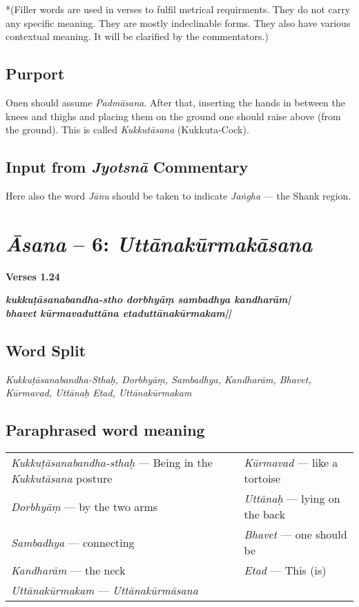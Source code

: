 *(Filler words are used in verses to fulfil metrical requirments. They do not carry any specific meaning. They are mostly indeclinable forms. They also have various contextual meaning. It will be clarified by the commentators.)


\subsection*{Purport}

Onen should assume \textit{Padmāsana}. After that, inserting the hands in between the knees and thighs and placing them on the ground one should raise above (from the ground). This is called \textit{Kukkutāsana} (Kukkuta-Cock).
\vspace{-10pt}

\subsection*{Input from \textit{Jyotsnā} Commentary}

Here also the word \textit{Jānu} should be taken to indicate \textit{Jaṅgha} --- the Shank region. 

\section*{\textit{Āsana} -- 6: \textit{Uttānakūrmakāsana}}

\noindent \textbf{Verses 1.24}

\begin{shloka}
\textit{\textbf{kukkuṭāsanabandha-stho dorbhyāṃ sambadhya kandharām|}\\
\textbf{bhavet kūrmavaduttāna etaduttānakūrmakam||}}
\end{shloka}

\subsection*{Word Split}

\textit{Kukkuṭāsanabandha-Sthaḥ,  Dorbhyāṃ, Sambadhya,  Kandharām, Bhavet,  Kūrmavad, Uttānaḥ Etad, Uttānakūrmakam}

\subsection*{Paraphrased word meaning}

\begin{longtable}{>{\noindent\raggedright}p{5cm}>{\noindent\raggedright}p{5cm}}
\textit{Kukkuṭāsanabandha-sthaḥ} --- Being in the \textit{Kukkutāsana} posture  & \textit{Kūrmavad} --- like a tortoise\tabularnewline
\textit{Dorbhyāṃ} --- by the two arms  & \textit{Uttānaḥ} --- lying on the back\tabularnewline
\textit{Sambadhya} --- connecting  & \textit{Bhavet} --- one should be\tabularnewline
\textit{Kandharām} --- the neck  & \textit{Etad} --- This (is)\tabularnewline
\textit{Uttānakūrmakam} --- \textit{Uttānakūrmāsana} & 
\end{longtable}

